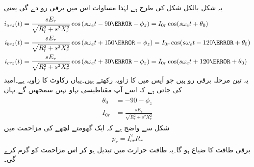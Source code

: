 یہ شکل بالکل شکل   کی طرح ہے لہٰذا مساوات   اس میں برقی رو دے گی یعنی
\begin{gather}
\begin{aligned}
i_{arz}(t)&=\frac{s E_r}{\sqrt{R_r^2+s^2 X_r^2}} \cos \left(s \omega_e t -90\degree-\phi_z \right)=I_{0r} \cos (s \omega_e t +\theta_0)\\
i_{brz}(t)&=\frac{s E_r}{\sqrt{R_r^2+s^2 X_r^2}} \cos \left(s \omega_e t +150\degree-\phi_z \right)=I_{0r} \cos (s \omega_e t -120 \degree+\theta_0)\\
i_{crz}(t)&=\frac{s E_r}{\sqrt{R_r^2+s^2 X_r^2}} \cos \left(s \omega_e t +30\degree-\phi_z \right)=I_{0r} \cos (s \omega_e t+120\degree +\theta_0)
\end{aligned}
\end{gather}
یہ تین مرحلہ برقی رو ہیں جو آپس میں  کا زاویہ رکھتے ہیں۔یہاں  رکاوٹ کا زاویہ ہے۔امید کی جاتی ہے کہ اسے آپ مقناطیسی بہاو نہیں سمجھیں گے۔یہاں
\begin{gather}
\begin{aligned}\label{مساوات_امالی_گھومتا_رو}
\theta_0&=-90-\phi_z \\
I_{0r}&=\frac{s E_r}{\sqrt{R_r^2+s^2 X_r^2}}
\end{aligned}
\end{gather}
شکل   سے واضح ہے کہ ایک گھومتے لچھے کی مزاحمت میں 
\begin{align}\label{مساوات_امالی_طاقت_ضیاع_گھمتا_حصہ}
p_r =I_{or}^2 R_r
\end{align}
برقی طاقت کا ضیاع ہو گا۔یہ طاقت حرارت میں تبدیل ہو کر اس مزاحمت کو گرم کرے گی۔

